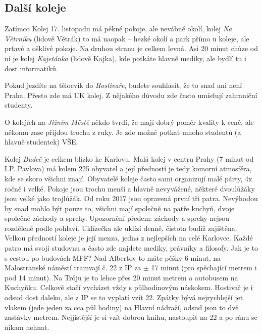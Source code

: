 ﻿\subsection{Další koleje}
Zatímco Kolej 17. listopadu má pěkné pokoje, ale nevábné okolí, kolej \textit{Na
Větrníku} (lidově Větrák) to má naopak – hezké okolí a park přímo u koleje, ale
prťavé a ošklivé pokoje. Na druhou stranu je celkem levná. Asi 20 minut chůze od
ní je kolej \textit{Kajetánka} (lidově Kajka), kde potkáte hlavně mediky, ale
bydlí tu i dost informatiků.

Pokud jezdíte na tělocvik do \textit{Hostivaře}, budete souhlasit, že to snad
ani není Praha. Přesto zde má UK kolej. Z nějakého důvodu zde často umísťují
zahraniční studenty.

O kolejích na \textit{Jižním Městě} někdo tvrdí, že mají dobrý poměr kvality k
ceně, ale někomu zase přijdou trochu z ruky. Je zde možné potkat mnoho studentů
(a hlavně studentek) VŠE.

Kolej \textit{Budeč} je celkem blízko ke Karlovu. Malá kolej v centru Prahy (7
minut od I.P. Pavlova) má kolem 225 obyvatel a její předností je tedy komorní
atmosféra, kde se skoro všichni znají. Obyvatelé koleje často sami organizují
malé párty, 4x ročně i velké. Pokoje jsou trochu menší a hlavně nevyvážené,
některé dvoulůžáky jsou velké jako trojlůžák. Od roku 2017 jsou opravená první
tři patra. Nevýhodou by snad mohlo být pouze to, všichni mají společně na patře kuchyň, dvoje
společné záchody a sprchy. Upozornění předem: záchody a sprchy nejsou rozdělené podle pohlaví.
Uklízečka ale uklízí denně, čistota budiž zajištěna. Velkou předností koleje je
její menza, jedna z nejlepších na celé Karlovce. Každé patro má svoji studovnu a
často zde najdete mediky, právníky a filosofy. Jak je to s cestou po budovách
MFF? Nad Albertov to máte pěšky 6 minut, na Malostranské náměstí tramvají č. 22
z IP za $\pm$ 17 minut (pro spěchající metrem i pod 14 minut). Na Tróju je to
lehce přes 20 minut metrem a autobusem na Kuchyňku. Celkově stačí vycházet vždy s
půlhodinovým náskokem. Hostivař je i odsud dost daleko, ale z IP se to vyplatí
vzít 22. Zpátky bývá nejrychlejší jet vlakem (jede jeden za cca půl hodiny) na
Hlavní nádraží, odsud jsou to dvě zastávky metrem. Nejjistější je si vzít dobrou
knihu, nastoupit na 22 a po ránu se nikam nehnat.

